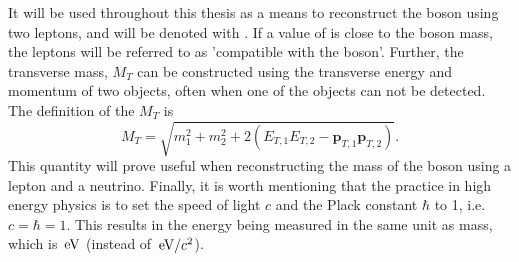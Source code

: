 It will be used throughout this thesis as a means to reconstruct the \PZ boson using two leptons, and will be denoted with \mll. 
If a  value of \mll is close to the \PZ boson mass, the leptons will be referred to as 'compatible with the \PZ boson'.  
\newpara
\noindent\justify
Further, the transverse mass, $M_{T}$ can be constructed using the transverse energy and momentum of two objects, often when one of the objects can not be detected. 
The definition of the $M_{T}$ is 
\begin{equation}
M_{T}=\sqrt{m_{1}^{2}+m_{2}^{2}+2(E_{T,1}E_{T,2}-\mathbf{p}_{T,1}\mathbf{p}_{T,2})}.
\end{equation}
This quantity will prove useful when reconstructing the mass of the \PW boson using a lepton and a neutrino.                        
\newpara
\noindent\justify
Finally, it is worth mentioning that the practice in high energy physics is to set the speed of light $c$ and the Plack constant $\hbar$ to 1, i.e. $c=\hbar=1$. 
This results in the energy being measured in the same unit as mass, which is $\,\text{e\hspace{-.08em}V}$ (instead of $\,\text{e\hspace{-.08em}V}/c^{2}$).  
